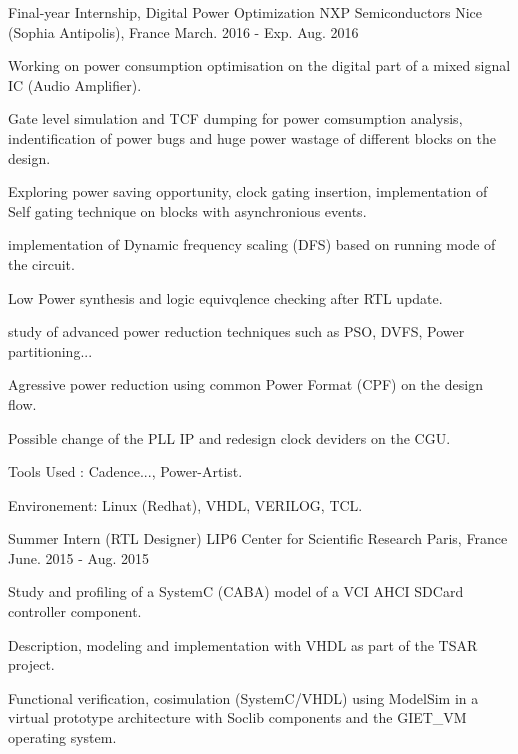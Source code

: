 

\begin{cventries}

  \cventry
    {Final-year Internship, Digital Power Optimization} %
    {NXP Semiconductors} %
    {Nice (Sophia Antipolis), France} %
    {March. 2016 - Exp. Aug. 2016} %
    {
      \begin{cvitems} %
	\item {Working on power consumption optimisation on the digital part of a mixed signal IC (Audio Amplifier).}
	\item { Gate level simulation and TCF dumping for power comsumption analysis, indentification of power bugs and huge power wastage of different blocks on the design.}
	\item {Exploring power saving opportunity, clock gating insertion, implementation of Self gating technique on blocks with asynchronious events.}
	\item {implementation of Dynamic frequency scaling (DFS) based on running mode of the circuit. }
	\item {Low Power synthesis and logic equivqlence checking after RTL update.}
	\item {study of advanced power reduction techniques such as PSO, DVFS, Power partitioning...}
        \item {Agressive power reduction using common Power Format (CPF) on the design flow.}
	\item {Possible change of the PLL IP and redesign clock deviders on the CGU.}
	\item {Tools Used : Cadence..., Power-Artist.}
	\item {Environement: Linux (Redhat), VHDL, VERILOG, TCL.}
      \end{cvitems}
    }

  \cventry
    {Summer Intern (RTL Designer)} %
    {LIP6 Center for Scientific Research} %
    {Paris, France} %
    {June. 2015 - Aug. 2015} %
    {
      \begin{cvitems} %
	\item {Study and profiling of a SystemC (CABA) model of a VCI AHCI SDCard controller component.}
	\item {Description, modeling and implementation with VHDL as part of the TSAR project.}
	\item {Functional verification, cosimulation (SystemC/VHDL) using ModelSim in a virtual prototype architecture with Soclib components and the GIET\_VM operating system.}
      \end{cvitems}
    }

\end{cventries}
